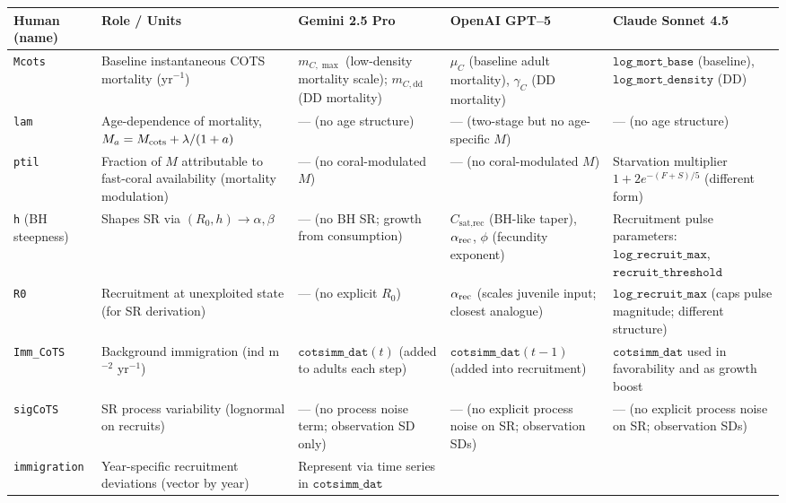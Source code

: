 \begin{landscape}
\begin{table}[htbp]
\centering
\footnotesize
\renewcommand{\arraystretch}{1.15}
\setlength{\tabcolsep}{3pt}
\begin{tabularx}{\linewidth}{@{}l l l l X@{}}
\toprule
\textbf{Human (name)} & \textbf{Role / Units} & \textbf{Gemini 2.5 Pro} & \textbf{OpenAI GPT--5} & \textbf{Claude Sonnet 4.5} \\
\midrule
\texttt{Mcots} & Baseline instantaneous COTS mortality (yr$^{-1}$) &
$m_{C,\max}$ (low-density mortality scale); $m_{C,\text{dd}}$ (DD mortality) &
$\mu_C$ (baseline adult mortality), $\gamma_C$ (DD mortality) &
$\texttt{log\_mort\_base}$ (baseline), $\texttt{log\_mort\_density}$ (DD) \\
\texttt{lam} & Age-dependence of mortality, $M_a = M_{\rm cots}+\lambda/(1+a)$ &
--- (no age structure) & --- (two-stage but no age-specific $M$) & --- (no age structure) \\
\texttt{ptil} & Fraction of $M$ attributable to fast-coral availability (mortality modulation) &
--- (no coral-modulated $M$) &
--- (no coral-modulated $M$) &
Starvation multiplier $1+2e^{-(F+S)/5}$ (different form) \\
\texttt{h} (BH steepness) & Shapes SR via $(R_0,h)\rightarrow \alpha,\beta$ &
--- (no BH SR; growth from consumption) &
$C_{\text{sat,rec}}$ (BH-like taper), $\alpha_{\rm rec}$, $\phi$ (fecundity exponent) &
Recruitment pulse parameters: $\texttt{log\_recruit\_max}$, $\texttt{recruit\_threshold}$ \\
\texttt{R0} & Recruitment at unexploited state (for SR derivation) &
--- (no explicit $R_0$) &
$\alpha_{\rm rec}$ (scales juvenile input; closest analogue) &
$\texttt{log\_recruit\_max}$ (caps pulse magnitude; different structure) \\
\texttt{Imm\_CoTS} & Background immigration (ind m$^{-2}$ yr$^{-1}$) &
$\texttt{cotsimm\_dat}(t)$ (added to adults each step) &
$\texttt{cotsimm\_dat}(t\!-\!1)$ (added into recruitment) &
$\texttt{cotsimm\_dat}$ used in favorability and as growth boost \\
\texttt{sigCoTS} & SR process variability (lognormal on recruits) &
--- (no process noise term; observation SD only) &
--- (no explicit process noise on SR; observation SDs) &
--- (no explicit process noise on SR; observation SDs) \\
\texttt{immigration} & Year-specific recruitment deviations (vector by year) &
Represent via time series in $\texttt{cotsimm\_dat}$ &

\end{tabularx}
\end{table}
\end{landscape}
